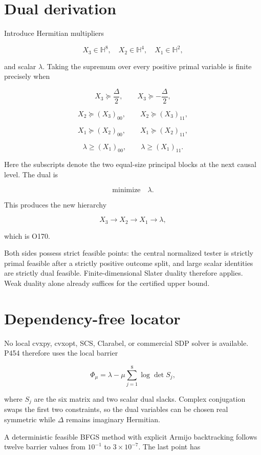 \documentclass[11pt,a4paper,openany]{report}
\begin{document}
\section{Dual derivation}

Introduce Hermitian multipliers

\[
X_3\in\mathbb H^8,
\quad X_2\in\mathbb H^4,
\quad X_1\in\mathbb H^2,
\]

and scalar \(\lambda\). Taking the supremum over every positive primal variable is finite precisely when

\[
X_3\succeq\frac{\Delta}{2},
\qquad
X_3\succeq-\frac{\Delta}{2},
\]

\[
X_2\succeq (X_3)_{00},
\qquad
X_2\succeq (X_3)_{11},
\]

\[
X_1\succeq (X_2)_{00},
\qquad
X_1\succeq (X_2)_{11},
\]

\[
\lambda\ge(X_1)_{00},
\qquad
\lambda\ge(X_1)_{11}.
\]

Here the subscripts denote the two equal-size principal blocks at the next causal level. The dual is

\[
\text{minimize}\quad\lambda.
\]

This produces the new hierarchy

\[
\boxed{X_3\to X_2\to X_1\to\lambda},
\]

which is O170.

Both sides possess strict feasible points: the central normalized tester is strictly primal feasible after a strictly positive outcome split, and large scalar identities are strictly dual feasible. Finite-dimensional Slater duality therefore applies. Weak duality alone already suffices for the certified upper bound.

\section{Dependency-free locator}

No local cvxpy, cvxopt, SCS, Clarabel, or commercial SDP solver is available. P454 therefore uses the local barrier

\[
\Phi_\mu=
\lambda-\mu\sum_{j=1}^{8}\log\det S_j,
\]

where \(S_j\) are the six matrix and two scalar dual slacks. Complex conjugation swaps the first two constraints, so the dual variables can be chosen real symmetric while \(\Delta\) remains imaginary Hermitian.

A deterministic feasible BFGS method with explicit Armijo backtracking follows twelve barrier values from \(10^{-1}\) to \(3\times10^{-7}\). The last point has
\end{document}
